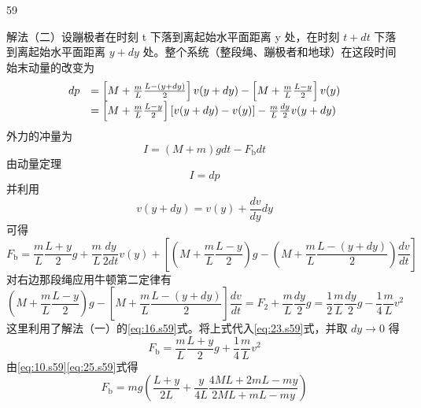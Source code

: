 \begin{solution}{59}
\begin{subsolution}
        解法（二）设蹦极者在时刻 t 下落到离起始水平面距离 y 处，在时刻 $t + dt$ 下落到离起始水平面距离 $y + dy$ 处。整个系统（整段绳、蹦极者和地球）在这段时间始末动量的改变为
        \begin{equation}
            \begin{array}{r l}
                d p & = \left[ M + \frac {m}{L} \frac {L - (y + d y)}{2} \right] v (y + d y) - \left[ M + \frac {m}{L} \frac {L - y}{2} \right] v (y) \\
                & = \left[ M + \frac {m}{L} \frac {L - y}{2} \right] \left[ v (y + d y) - v (y) \right] - \frac {m}{L} \frac {d y}{2} v (y + d y)
            \end{array}
            \label{eq:19.s59}
        \end{equation}
        外力的冲量为
        \begin{equation}
            I = (M + m) g d t - F _ {\mathrm{b}} d t
            \label{eq:20.s59}
        \end{equation}
        由动量定理
        \begin{equation}
            I = d p
            \label{eq:21.s59}
        \end{equation}
        并利用
        \begin{equation}
            v (y + d y) = v (y) + \frac {d v}{d y} d y
            \label{eq:22.s59}
        \end{equation}
        可得
        \begin{equation}
            F _ {\mathrm{b}} = \frac {m}{L} \frac {L + y}{2} g + \frac {m}{L} \frac {d y}{2 d t} v (y) + \left[ \left(M + \frac {m}{L} \frac {L - y}{2}\right) g - \left(M + \frac {m}{L} \frac {L - (y + d y)}{2}\right) \frac {d v}{d t} \right]
            \label{eq:23.s59}
        \end{equation}
        对右边那段绳应用牛顿第二定律有
        \begin{equation}
            (M + \frac {m}{L} \frac {L - y}{2}) g - \left[ M + \frac {m}{L} \frac {L - (y + d y)}{2} \right] \frac {d v}{d t} = F _ {2} + \frac {m}{L} \frac {d y}{2} g = \frac {1}{2} \frac {m}{L} \frac {d y}{2} g - \frac {1}{4} \frac {m}{L} v^{2}
            \label{eq:24.s59}
        \end{equation}
        这里利用了解法（一）的\eqref{eq:16.s59}式。将上式代入\eqref{eq:23.s59}式，并取 $dy \rightarrow 0$ 得
        \begin{equation}
            F _ {\mathrm{b}} = \frac {m}{L} \frac {L + y}{2} g + \frac {1}{4} \frac {m}{L} v^{2}
            \label{eq:25.s59}
        \end{equation}
        由\eqref{eq:10.s59}\eqref{eq:25.s59}式得
        \begin{equation}
            F _ {\mathrm{b}} = m g \left(\frac {L + y}{2 L} + \frac {y}{4 L} \frac {4 M L + 2 m L - m y}{2 M L + m L - m y}\right)
            \label{eq:26.s59}
        \end{equation}


\end{subsolution}
\end{solution}
